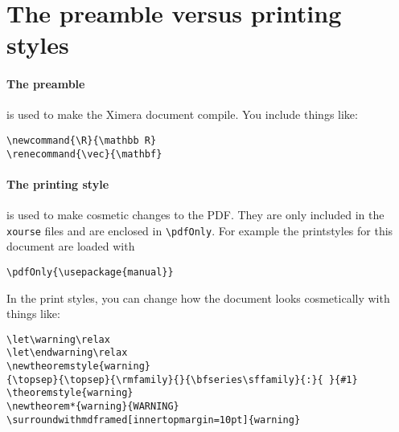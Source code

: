\documentclass{ximera}
\begin{document}
\section{The preamble versus printing styles}

\paragraph{The preamble} is used to make the Ximera document compile. You include things like:
\begin{verbatim}
\newcommand{\R}{\mathbb R}
\renecommand{\vec}{\mathbf}
\end{verbatim}


\paragraph{The printing style} is used to make cosmetic changes to the PDF. They are only
included in the \verb!xourse! files and are enclosed in \verb!\pdfOnly!. For
example the printstyles for this document are loaded with
\begin{verbatim}
\pdfOnly{\usepackage{manual}}
\end{verbatim}
In the print styles, you can change how the document looks cosmetically with things like:
\begin{verbatim}
\let\warning\relax
\let\endwarning\relax
\newtheoremstyle{warning}
{\topsep}{\topsep}{\rmfamily}{}{\bfseries\sffamily}{:}{ }{#1}
\theoremstyle{warning}
\newtheorem*{warning}{WARNING}
\surroundwithmdframed[innertopmargin=10pt]{warning}
\end{verbatim}



\end{document}

